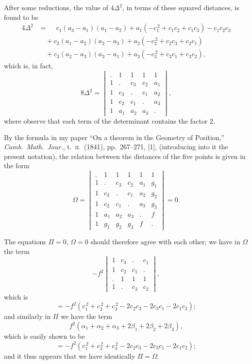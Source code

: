\documentclass[11pt,a4paper]{book}
\begin{document}
After some reductions, the value of $4\Delta^2$, in terms of these squared distances, is found to be
\begin{align*}
4\Delta^2 &= \phantom{+} c_1(a_3 - a_1)(a_1 - a_2) + a_1(-c_1^{\,2} + c_1 c_2 + c_1 c_3) - c_1 c_2 c_3 \\
&\quad + c_2(a_1 - a_2)(a_2 - a_3) + a_2(-c_2^{\,2} + c_2 c_3 + c_2 c_1) \\
&\quad + c_3(a_2 - a_3)(a_3 - a_1) + a_3(-c_3^{\,2} + c_3 c_1 + c_3 c_2),
\end{align*}
which is, in fact,
\[
8\Delta^2 = \begin{vmatrix}
. & 1 & 1 & 1 & 1 \\
1 & . & c_3 & c_2 & a_1 \\
1 & c_3 & . & c_1 & a_2 \\
1 & c_2 & c_1 & . & a_3 \\
1 & a_1 & a_2 & a_3 & .
\end{vmatrix},
\]
where observe that each term of the determinant contains the factor $2$.

By the formula in my paper ``On a theorem in the Geometry of Position,'' \textit{Camb.\ Math.\ Jour.}, t.\ \textsc{ii}.\ (1841), pp.\ 267--271, [1], (introducing into it the present notation), the relation between the distances of the five points is given in the form
\[
\Omega = \begin{vmatrix}
. & 1 & 1 & 1 & 1 & 1 \\
1 & . & c_3 & c_2 & a_1 & g_1 \\
1 & c_3 & . & c_1 & a_2 & g_2 \\
1 & c_2 & c_1 & . & a_3 & g_3 \\
1 & a_1 & a_2 & a_3 & . & f \\
1 & g_1 & g_2 & g_3 & f & .
\end{vmatrix} = 0.
\]

The equations $\Pi = 0$, $\Omega = 0$ should therefore agree with each other; we have in $\Omega$ the term
\[
-f^2 \begin{vmatrix}
1 & c_3 & . & c_1 \\
1 & c_2 & c_1 & . \\
. & 1 & 1 & 1 \\
1 & . & c_3 & c_2
\end{vmatrix},
\]
which is
\[ = -f^2(c_1^{\,2} + c_2^{\,2} + c_3^{\,2} - 2c_2 c_3 - 2c_3 c_1 - 2c_1 c_2); \]
and similarly in $\Pi$ we have the term
\[ f^2(\alpha_1 + \alpha_2 + \alpha_3 + 2\beta_1 + 2\beta_2 + 2\beta_3), \]
which is easily shown to be
\[ = -f^2(c_1^{\,2} + c_2^{\,2} + c_3^{\,2} - 2c_2 c_3 - 2c_3 c_1 - 2c_1 c_2); \]
and it thus appears that we have identically $\Pi = \Omega$.
\end{document}
